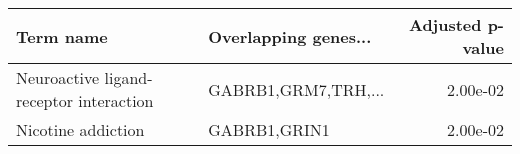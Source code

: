 \begin{tabular}{llr}
\toprule
                              Term name & Overlapping genes... &  Adjusted p-value \\
\midrule
Neuroactive ligand-receptor interaction &  GABRB1,GRM7,TRH,... &          2.00e-02 \\
                     Nicotine addiction &         GABRB1,GRIN1 &          2.00e-02 \\
\bottomrule
\end{tabular}
